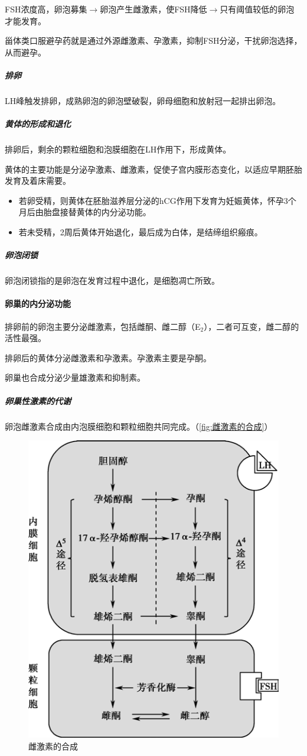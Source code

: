 FSH浓度高，卵泡募集$\longrightarrow$卵泡产生雌激素，使FSH降低$\longrightarrow$只有阈值较低的卵泡才能发育。

甾体类口服避孕药就是通过外源雌激素、孕激素，抑制FSH分泌，干扰卵泡选择，从而避孕。

\subparagraph{排卵}

LH峰触发排卵，成熟卵泡的卵泡壁破裂，卵母细胞和放射冠一起排出卵泡。

\subparagraph{黄体的形成和退化}

排卵后，剩余的颗粒细胞和泡膜细胞在LH作用下，形成黄体。

黄体的主要功能是分泌孕激素、雌激素，促使子宫内膜形态变化，以适应早期胚胎发育及着床需要。

\begin{itemize}
	\item 若卵受精，则黄体在胚胎滋养层分泌的hCG作用下发育为妊娠黄体，怀孕3个月后由胎盘接替黄体的内分泌功能。
	\item 若未受精，2周后黄体开始退化，最后成为白体，是结缔组织瘢痕。
\end{itemize}

\subparagraph{卵泡闭锁}

卵泡闭锁指的是卵泡在发育过程中退化，是细胞凋亡所致。

\paragraph{卵巢的内分泌功能}

排卵前的卵泡主要分泌雌激素，包括雌酮、雌二醇（E$_{2}$），二者可互变，雌二醇的活性最强。

排卵后的黄体分泌雌激素和孕激素。孕激素主要是孕酮。

卵巢也合成分泌少量雄激素和抑制素。

\subparagraph{卵巢性激素的代谢}

卵泡雌激素合成由内泡膜细胞和颗粒细胞共同完成。（\autoref{fig:雌激素的合成}）

\begin{figure}[htbp]
	\centering
	\includegraphics[width=0.5\linewidth]{Pics/雌激素的合成}
	\caption{雌激素的合成}
	\label{fig:雌激素的合成}
\end{figure}

